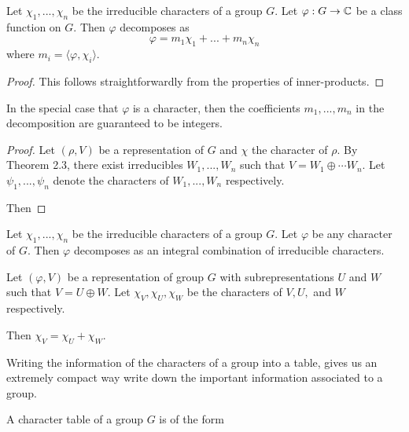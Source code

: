     
\begin{corollary}
    Let $\chi_1, ..., \chi_n$ be the irreducible characters of a group $G$. Let $\varphi : G \rightarrow \mathbb{C}$ be a 
    class function on $G$. Then $\varphi$ decomposes as 
    \[
       \varphi = m_1 \chi_1 + ... + m_n \chi_n
    \]
    where $m_i = \langle \varphi, \chi_i \rangle$.
\end{corollary}
\begin{proof}
    This follows straightforwardly from the properties of inner-products.
\end{proof}

\begin{theorem}
    In the special case that $\varphi$ is a character, then the coefficients $m_1, ..., m_n$ in the decomposition 
    are guaranteed to be integers.
\end{theorem}

\begin{proof}
    Let $(\rho, V)$ be a representation of $G$ and $\chi$ the character of $\rho$. By Theorem 2.3, there exist 
irreducibles $W_1, ..., W_n$ such that $V = W_1 \oplus \cdots W_n$. Let $\psi_1, ..., \psi_n$ denote the characters 
of $W_1, ..., W_n$ respectively.

Then 
\end{proof}


\begin{theorem}
    Let $\chi_1, ..., \chi_n$ be the irreducible characters of a group $G$. Let $\varphi$ be any character of $G$.  
    Then $\varphi$ decomposes as an integral combination of irreducible characters.  
\end{theorem}

\begin{lemma}
    Let $(\varphi, V)$ be a representation of group $G$ with subrepresentations $U$ and $W$ such that $V = U \oplus 
    W$. Let $\chi_V, \chi_U, \chi_W$ be the characters of $V, U,$ and $W$ respectively.

    Then $\chi_V = \chi_U + \chi_W$.
\end{lemma}



    Writing the information of the characters of a group into a table, gives us an extremely compact way write down 
    the important information associated to a group.

\begin{definition}
    A character table of a group $G$ is of the form 
    

\end{definition}


